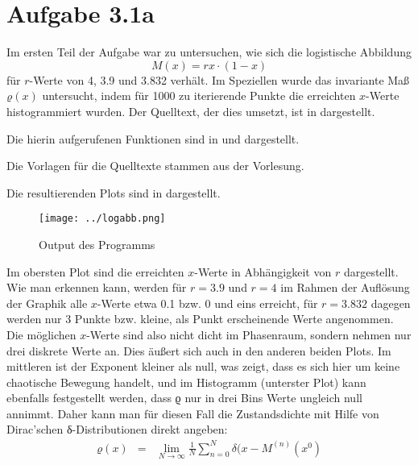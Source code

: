 \section*{Aufgabe 3.1a}
\label{sec:1a}
Im ersten Teil der Aufgabe war zu untersuchen, wie sich die logistische
Abbildung $$M(x) = rx\cdot (1-x)$$ für $r$-Werte von 4, 3.9 und 3.832 verhält.
Im Speziellen wurde das invariante Maß $ϱ(x)$ untersucht, indem für 1000 zu
iterierende Punkte die erreichten $x$-Werte histogrammiert wurden. Der
Quelltext, der dies umsetzt, ist in  dargestellt.



Die hierin aufgerufenen Funktionen sind in  und 
dargestellt.





Die Vorlagen für die Quelltexte stammen aus der Vorlesung. 

Die resultierenden Plots sind in  dargestellt.
\begin{figure}[htb]
\centering
  \texttt{[image: ../logabb.png]}
  \caption{Output des Programms}
  \label{fig:logabb}
\end{figure}

Im obersten Plot sind die erreichten $x$-Werte in Abhängigkeit von $r$
dargestellt. Wie man erkennen kann, werden für $r=3.9$ und $r=4$ im Rahmen der
Auflösung der Graphik alle $x$-Werte etwa 0.1 bzw. 0 und eins erreicht, für
$r=3.832$ dagegen werden nur 3 Punkte bzw. kleine, als Punkt erscheinende Werte
angenommen. Die möglichen $x$-Werte sind also nicht dicht im Phasenraum,
sondern nehmen nur drei diskrete Werte an. Dies äußert sich auch in den
anderen beiden Plots. Im mittleren ist der Exponent kleiner als null, was
zeigt, dass es sich hier um keine chaotische Bewegung handelt, und im
Histogramm (unterster Plot) kann ebenfalls festgestellt werden, dass ϱ nur in
drei Bins Werte ungleich null annimmt. Daher kann man für diesen Fall die
Zustandsdichte mit Hilfe von Dirac’schen δ-Distributionen direkt angeben:
\begin{eqnarray}
ϱ(x) &=& \lim_{N\to\infty}\frac{1}{N}\sum_{n=0}^{N}δ(x - M^{(n)}(x^0)
\end{eqnarray}

